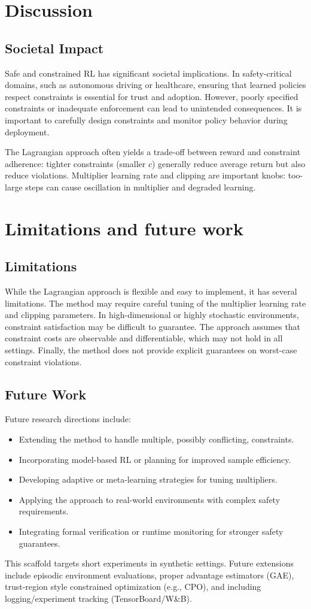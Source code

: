 \section{Discussion}
\subsection{Societal Impact}
Safe and constrained RL has significant societal implications. In safety-critical domains, such as autonomous driving or healthcare, ensuring that learned policies respect constraints is essential for trust and adoption. However, poorly specified constraints or inadequate enforcement can lead to unintended consequences. It is important to carefully design constraints and monitor policy behavior during deployment.

The Lagrangian approach often yields a trade-off between reward and constraint adherence: tighter constraints (smaller $c$) generally reduce average return but also reduce violations. Multiplier learning rate and clipping are important knobs: too-large steps can cause oscillation in multiplier and degraded learning.

\section{Limitations and future work}
\subsection{Limitations}
While the Lagrangian approach is flexible and easy to implement, it has several limitations. The method may require careful tuning of the multiplier learning rate and clipping parameters. In high-dimensional or highly stochastic environments, constraint satisfaction may be difficult to guarantee. The approach assumes that constraint costs are observable and differentiable, which may not hold in all settings. Finally, the method does not provide explicit guarantees on worst-case constraint violations.

\subsection{Future Work}
Future research directions include:
\begin{itemize}
  \item Extending the method to handle multiple, possibly conflicting, constraints.
  \item Incorporating model-based RL or planning for improved sample efficiency.
  \item Developing adaptive or meta-learning strategies for tuning multipliers.
  \item Applying the approach to real-world environments with complex safety requirements.
  \item Integrating formal verification or runtime monitoring for stronger safety guarantees.
\end{itemize}
This scaffold targets short experiments in synthetic settings. Future extensions include episodic environment evaluations, proper advantage estimators (GAE), trust-region style constrained optimization (e.g., CPO), and including logging/experiment tracking (TensorBoard/W&B).

